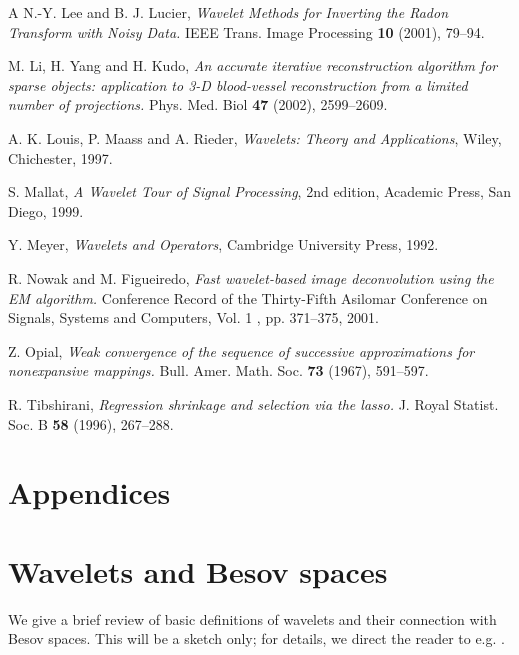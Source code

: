\documentclass[10pt]{article}
\begin{document}
\begin{thebibliography}{A}
  N.-Y. Lee and B. J. Lucier,
\textit{Wavelet Methods for Inverting the Radon Transform with Noisy Data.}
IEEE Trans. Image Processing \textbf{10} (2001), 79--94.

 M. Li, H. Yang and H. Kudo, \textit{An accurate iterative
reconstruction algorithm for sparse objects: application to 3-D blood-vessel
reconstruction from a limited number of projections.} Phys. Med. Biol
\textbf{47}
(2002), 2599--2609.

 A. K. Louis, P. Maass and A. Rieder, \textit{Wavelets:
Theory and Applications}, Wiley, Chichester, 1997.

 S. Mallat, \textit{A Wavelet Tour of Signal
Processing}, 2nd edition, Academic Press, San Diego, 1999.

 Y. Meyer, \textit{Wavelets and Operators}, Cambridge
University Press, 1992.

 R. Nowak and M. Figueiredo, \textit{Fast wavelet-based
image deconvolution using the EM algorithm.} Conference Record of the
Thirty-Fifth
Asilomar Conference on Signals, Systems and Computers, Vol. 1 ,
pp. 371--375, 2001.

 Z. Opial, \textit{Weak convergence of the sequence of
successive approximations for nonexpansive mappings.} Bull. Amer. Math. Soc.
\textbf{73} (1967), 591--597.

 R. Tibshirani, \textit{Regression shrinkage and
selection via the lasso.} J. Royal Statist. Soc. B \textbf{58} (1996),
267--288.


\end{thebibliography}





\section*{Appendices}
\appendix

\section{Wavelets and Besov spaces}
\label{WavBes}

We give a brief review of basic definitions of wavelets and their
connection with Besov spaces.
This will be a sketch only; for details, we direct the reader to e.g.
\cite{Mey92, DeV98, Coh00, Mal98}.
\end{document}
